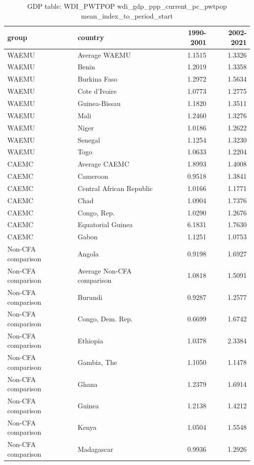 \begin{table}

\caption{GDP table: WDI_PWTPOP wdi_gdp_ppp_current_pc_pwtpop mean_index_to_period_start}
\centering
\begin{tabular}[t]{llrr}
\toprule
group & country & 1990-2001 & 2002-2021\\
\midrule
WAEMU & Average WAEMU & 1.1515 & 1.3326\\
WAEMU & Benin & 1.2019 & 1.3358\\
WAEMU & Burkina Faso & 1.2972 & 1.5634\\
WAEMU & Cote d'Ivoire & 1.0773 & 1.2775\\
WAEMU & Guinea-Bissau & 1.1820 & 1.3511\\
\addlinespace
WAEMU & Mali & 1.2460 & 1.3276\\
WAEMU & Niger & 1.0186 & 1.2622\\
WAEMU & Senegal & 1.1254 & 1.3230\\
WAEMU & Togo & 1.0633 & 1.2204\\
CAEMC & Average CAEMC & 1.8993 & 1.4008\\
\addlinespace
CAEMC & Cameroon & 0.9518 & 1.3841\\
CAEMC & Central African Republic & 1.0166 & 1.1771\\
CAEMC & Chad & 1.0904 & 1.7376\\
CAEMC & Congo, Rep. & 1.0290 & 1.2676\\
CAEMC & Equatorial Guinea & 6.1831 & 1.7630\\
\addlinespace
CAEMC & Gabon & 1.1251 & 1.0753\\
Non-CFA comparison & Angola & 0.9198 & 1.6927\\
Non-CFA comparison & Average Non-CFA comparison & 1.0818 & 1.5091\\
Non-CFA comparison & Burundi & 0.9287 & 1.2577\\
Non-CFA comparison & Congo, Dem. Rep. & 0.6699 & 1.6742\\
\addlinespace
Non-CFA comparison & Ethiopia & 1.0378 & 2.3384\\
Non-CFA comparison & Gambia, The & 1.1050 & 1.1478\\
Non-CFA comparison & Ghana & 1.2379 & 1.6914\\
Non-CFA comparison & Guinea & 1.2138 & 1.4212\\
Non-CFA comparison & Kenya & 1.0504 & 1.5548\\
\addlinespace
Non-CFA comparison & Madagascar & 0.9936 & 1.2926\\

\end{tabular}
\end{table}
